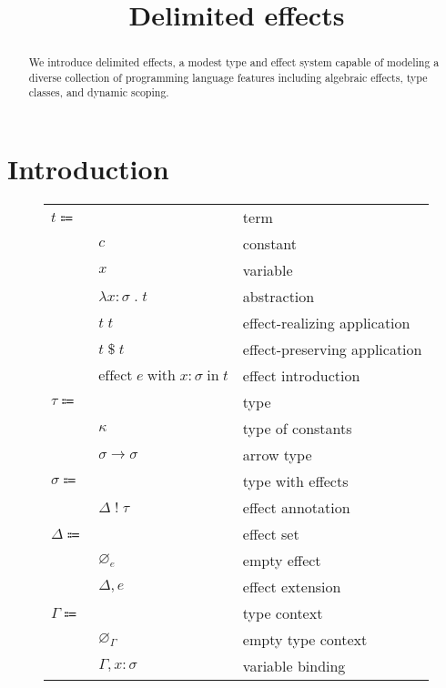 \documentclass[12pt]{article}
\title{Delimited effects}
\date{}
\newcommand\eterm{t}
\newcommand\econst{c}
\newcommand\evar{x}
\newcommand\eabs[2]{\lambda #1 \; . \; #2} %
\newcommand\eapp[2]{#1 \; #2}
\newcommand\eappx[2]{#1 \; \$ \; #2}
\newcommand\eeffect[4]{\text{effect} \; #1 \; \text{with} \; \tanno{#2}{#3} \; \text{in} \; #4}
\newcommand\ttype{\tau}
\newcommand\tconst{\kappa}
\newcommand\tarrow[2]{#1 \rightarrow #2} %
\newcommand\tanno[2]{#1 : #2} %
\newcommand\tx{\sigma}
\newcommand\twithx[2]{#1 \; ! \; #2} %
\newcommand\xeffect{e}
\newcommand\xeffects{\Delta}
\newcommand\xempty{\varnothing_{\xeffect}}
\newcommand\xextend[2]{#1, #2}
\newcommand\ccontext{\Gamma}
\newcommand\cempty{\varnothing_{\ccontext}}
\newcommand\cextend[2]{#1, #2}
\begin{document}
  \maketitle

  \begin{abstract}
    We introduce delimited effects, a modest type and effect system capable of modeling a diverse collection of programming language features including algebraic effects, type classes, and dynamic scoping.
  \end{abstract}

  \section{Introduction}

  \begin{figure}
    \begin{mdframed}
      \begin{center}
        \begin{tabular}{l l l}
          $\eterm \Coloneqq $ & & term \\
          & $\econst$ & constant \\
          & $\evar$ & variable \\
          & $\eabs{\tanno{\evar}{\tx}}{\eterm}$ & abstraction \\
          & $\eapp{\eterm}{\eterm}$ & effect-realizing application \\
          & $\eappx{\eterm}{\eterm}$ & effect-preserving application \\
          & $\eeffect{\xeffect}{\evar}{\tx}{\eterm}$ & effect introduction \\
          $\ttype \Coloneqq$ & & type \\
          & $\tconst$ & type of constants \\
          & $\tarrow{\tx}{\tx}$ & arrow type \\
          $\tx \Coloneqq$ & & type with effects \\
          & $\twithx{\xeffects}{\ttype}$ & effect annotation \\
          $\xeffects \Coloneqq$ & & effect set \\
          & $\xempty$ & empty effect \\
          & $\xextend{\xeffects}{\xeffect}$ & effect extension \\
          $\ccontext \Coloneqq$ & & type context \\
          & $\cempty$ & empty type context \\
          & $\cextend{\ccontext}{\tanno{\evar}{\tx}}$ & variable binding \\
        \end{tabular}
      \end{center}


\end{mdframed}
\end{figure}
\end{document}
